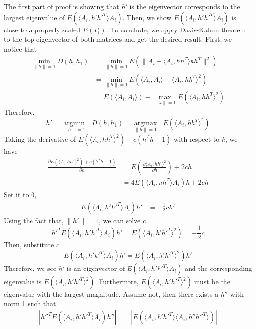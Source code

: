 \documentclass[10pt,journal,compsoc]{IEEEtran}
\newenvironment{proof}[1][Proof]{\begin{trivlist}
		\item[\hskip \labelsep {\bfseries #1}]}{\end{trivlist}}
\begin{document}
\begin{proof} [Proof of Theorem 4.2]
The first part of proof is showing that $h'$ is the eigenvector corresponds to the largest eigenvalue of $E(\langle A_{i},h' h'^T \rangle A_{i})$. Then, we show $E(\langle A_{i},h' h'^T \rangle A_{i})$ is close to a properly scaled $E(P_i)$. To conclude, we apply Davis-Kahan theorem to the top eigenvector of both matrices and get the desired result. First, we notice that
	\begin{align*}
	\underset{\|h\| =1}{\operatorname{min}}D(h,h_1) &=\underset{\|h\| =1}{\operatorname{min}}E(\|A_i- \langle A_i,h h^T \rangle h h^T\|^2) \\
	&=\underset{\|h\| =1}{\operatorname{min}}E(\langle A_i,A_i \rangle- \langle A_i,h h^T \rangle ^2) \\
	&=E(\langle A_i,A_i \rangle)-\underset{\|h\| =1}{\operatorname{max}}E( \langle A_i,h h^T \rangle ^2)
	\end{align*}
	Therefore, 
	\begin{equation} \label{eq:5}
	h'= \underset{\|h\| =1}{\operatorname{argmin}} \text{ }D(h,h_1)=\underset{\|h\| =1}{\operatorname{argmax}} \text{ } E(\langle A_i,h h^T \rangle ^2) 
	\end{equation}
	Taking the derivative of $E( \langle A_i,h h^T \rangle ^2)+ c(h^Th-1)$ with respect to $h$, we have 
	\begin{align*}
	\frac{\partial E( \langle A_i,h h^T \rangle ^2)+ c(h^Th-1) }{\partial h} & =  E(\frac{\partial  \langle A_i,h h^T \rangle ^2}{\partial h}) +2ch \\
	&=4 E( \langle A_i,h h^T \rangle A_i)h +2ch 
	\end{align*}
	Set it to $0$,
	\begin{align*} 
	E( \langle A_i,h' h'^T \rangle A_i)h' & = -\frac{1}{2}ch' 
	\end{align*}
	Using the fact that, $\|h'\|=1$, we can solve $c$
	\[ h'^T E( \langle A_i,h' h'^T \rangle A_i)h' = E( \langle A_i,h' h'^T \rangle^2)= -\frac{1}{2}c \]
	Then, substitute $c$
	\begin{equation}
	E( \langle A_i,h' h'^T \rangle A_i)h'=E( \langle A_i,h' h'^T \rangle^2)h'
	\end{equation}
	Therefore, we see $h'$ is an eigenvector of $E(\langle A_{i},h' h'^T \rangle A_{i})$ and the corresponding eigenvalue is $E(\langle A_{i},h' h'^T \rangle ^2)$. Furthermore, $E(\langle A_{i},h' h'^T \rangle ^2)$ must be the eigenvalue with the largest magnitude. Assume not, then there exists a $h''$ with norm 1 such that
	\begin{align*}  | h''^T E(\langle A_{i},h' h'^T \rangle A_{i}) h''| &= |E(\langle A_{i},h' h'^T \rangle \langle A_{i},h'' h''^T \rangle)| \\

\end{align*}
\end{proof}
\end{document}

